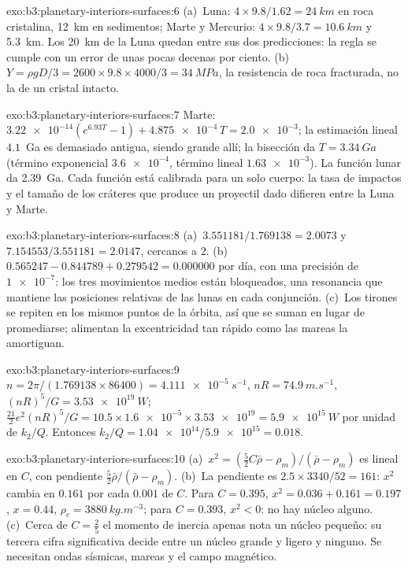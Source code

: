\begin{solution}{exo:b3:planetary-interiors-surfaces:6}
(a)~Luna: $4\times9.8/1.62 = \qty{24}{km}$ en roca cristalina,
\qty{12}{km} en sedimentos; Marte y Mercurio: $4\times9.8/3.7 =
\qty{10.6}{km}$ y \qty{5.3}{km}. Los \qty{20}{km} de la Luna quedan entre
sus dos predicciones: la regla se cumple con un error de unas pocas decenas por ciento. (b)~$Y =
\rho gD/3 = 2600\times9.8\times4000/3 = \qty{34}{MPa}$, la resistencia de
roca fracturada, no la de un cristal intacto.
\end{solution}

\begin{solution}{exo:b3:planetary-interiors-surfaces:7}
Marte: $\num{3.22e-14}(e^{6.93T} - 1) + \num{4.875e-4}\,T = \num{2.0e-3}$;
la estimación lineal $4.1$~Ga es demasiado antigua, siendo grande
allí; la bisección da $T = \qty{3.34}{Ga}$ (término exponencial
$\num{3.6e-4}$, término lineal $\num{1.63e-3}$). La función lunar da
\qty{2.39}{Ga}. Cada función está calibrada para un solo cuerpo: la tasa de
impactos y el tamaño de los cráteres que produce un proyectil dado difieren
entre la Luna y Marte.
\end{solution}

\begin{solution}{exo:b3:planetary-interiors-surfaces:8}
(a)~$3.551181/1.769138 = 2.0073$ y $7.154553/3.551181 = 2.0147$, cercanos a
$2$. (b)~$0.565247 - 0.844789 + 0.279542 = 0.000000$ por día, con una precisión de
$\num{1e-7}$: los tres movimientos medios están bloqueados, una resonancia que mantiene
las posiciones relativas de las lunas en cada conjunción. (c)~Los tirones se repiten en
los mismos puntos de la órbita, así que se suman en lugar de promediarse;
alimentan la excentricidad tan rápido como las mareas la amortiguan.
\end{solution}

\begin{solution}{exo:b3:planetary-interiors-surfaces:9}
$n = 2\pi/(1.769138\times86400) = \qty{4.111e-5}{s^{-1}}$, $nR =
\qty{74.9}{m.s^{-1}}$, $(nR)^5/G = \qty{3.53e19}{W}$;
$\tfrac{21}{2}e^2(nR)^5/G = 10.5\times\num{1.6e-5}\times\num{3.53e19} =
\qty{5.9e15}{W}$ por unidad de $k_2/Q$. Entonces $k_2/Q =
\num{1.04e14}/\num{5.9e15} = 0.018$.
\end{solution}

\begin{solution}{exo:b3:planetary-interiors-surfaces:10}
(a)~$x^2 = (\tfrac52C\bar\rho - \rho_m)/(\bar\rho - \rho_m)$ es lineal en
$C$, con pendiente $\tfrac52\bar\rho/(\bar\rho - \rho_m)$. (b)~La pendiente es
$2.5\times3340/52 = 161$: $x^2$ cambia en $0.161$ por cada $0.001$ de $C$.
Para $C = 0.395$, $x^2 = 0.036 + 0.161 = 0.197$, $x = 0.44$, $\rho_c =
\qty{3880}{kg.m^{-3}}$; para $C = 0.393$, $x^2 < 0$: no hay núcleo alguno.
(c)~Cerca de $C = \tfrac25$ el momento de inercia apenas nota un núcleo pequeño:
su tercera cifra significativa decide entre un núcleo grande y ligero y ninguno.
Se necesitan ondas sísmicas, mareas y el campo magnético.
\end{solution}

